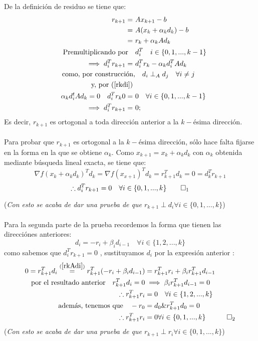 \documentclass[12pt]{article}
\newcommand{\beas}{\begin{eqnarray*}}
\newcommand{\eeas}{\end{eqnarray*}}
\begin{document}
\noindent De la definici\'on de residuo se tiene que: \\
\begin{align*}
r_{k+1} =\ &Ax_{k+1} - b \\ =\ &A(x_k + \alpha_kd_k)-b \\ =\ &r_k + \alpha_kAd_k \\
\text{Premultiplicando por  }\ \    &d_i^T \quad i \in \{0,1, ..., k-1 \}\\
\implies d_i^Tr_{k+1} = \ &d_i^Tr_{k} - \alpha_kd_i^TAd_k\\
\text{como, por construcci\'on,} &\quad d_i\perp_A d_j \quad \forall i \ne j \\
\text{ y, por (\ref{rkdi}) }& \\ 
\quad \alpha_kd_i^tAd_k=0  \quad d_i^Tr_k0=\ &0 \quad \forall i \in \{0,1, ..., k-1 \}  \\
\implies  d_i^Tr_{k+1} =\ &0 ;\\
\end{align*}
\noindent Es decir, $r_{k+1}$ es ortogonal a toda direcci\'on anterior a la $k-$\'esima direcci\'on. \\
\\

Para probar que $r_{k+1}$ es ortogonal a la $k-$\'esima direcci\'on, s\'olo hace falta fijarse en la forma en la que se obtiene $\alpha_k$. 
Como $x_{k+1} = x_k + \alpha_k d_k$ con $\alpha_k$ obtenida mediante b\'usqueda lineal exacta, se tiene que:
	$$\nabla f(x_k + \alpha_k d_k)^Td_k = \nabla f(x_{x+1})^Td_k = r_{k+1}^Td_k = 0 = d_k^Tr_{k+1}$$ 
	$$\therefore d_i^Tr_{k+1} = 0 \quad \forall i \in \{0,1, ..., k \}\\ \qed_1$$
	
({\it Con esto se acaba de dar una prueba de que $r_{k+1}\perp d_i \forall i \in \{0,1, ..., k\}$})	\\ \\
Para la segunda parte de la prueba recordemos la forma que tienen las direcci\'ones anteriores: $$d_i = -r_i +\beta_{i}d_{i-1} \quad \forall i \in \{1, 2, ..., k\}$$
como sabemos que $d_i^Tr_{k+1}= 0$ , sustituyamos $d_i$ por la expresi\'on anterior :
\beas
0=r_{k+1}^Td_i\stackrel{(\ref{rkAdi})}{=} r_{k+1}^T (-r_i + \beta_{i}d_{i-1} ) &= r_{k+1}^Tr_i + \beta_{i}r_{k+1}^Td_{i-1}\\
\text{por el resultado anterior}\quad  r_{k+1}^Td_i = 0 &\implies \beta_{i}r_{k+1}^Td_{i-1}= 0 \\
\therefore r_{k+1}^Tr_i &= 0 \quad \forall i \in \{1, 2, ..., k \} \\
\text{ adem\'as, tenemos que}  \quad -r_0 &= d_0 \& r_{k+1}^Td_0 = 0 \\
\therefore r_{k+1}^Tr_i &= 0 \forall i \in \{0,1, ...,k\}\quad  \qed_2
\eeas 
({\it Con esto se acaba de dar una prueba de que $r_{k+1}\perp r_i \forall i \in \{0,1, ..., k\}$})	\\ \\
\end{document}
